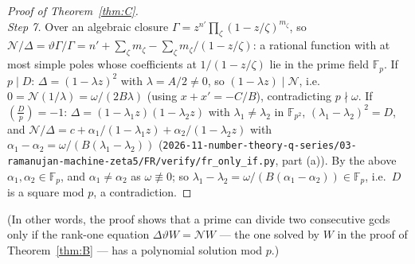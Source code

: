 \documentclass[11pt]{amsart}
\theoremstyle{definition}
\theoremstyle{remark}
\numberwithin{equation}{section}
\newcommand{\F}{\mathbb{F}}
\newcommand{\file}[1]{\nolinkurl{2026-11-number-theory-q-series/03-ramanujan-machine-zeta5/#1}}
\begin{document}
\begin{proof}[Proof of Theorem~\ref{thm:C}]
\[\]
\emph{Step 7.} Over an algebraic closure $\Gamma=z^{n'}\prod_\zeta(1-z/\zeta)^{m_\zeta}$, so $\mathcal N/\Delta=\vartheta\Gamma/\Gamma=n'+\sum_\zeta m_\zeta-\sum_\zeta m_\zeta/(1-z/\zeta)$: a rational function with at most simple poles whose coefficients at $1/(1-z/\zeta)$ lie in the prime field $\F_p$. If $p\mid D$: $\Delta=(1-\lambda z)^2$ with $\lambda=A/2\neq0$, so $(1-\lambda z)\mid\mathcal N$, i.e.\ $0=\mathcal N(1/\lambda)=\omega/(2B\lambda)$ (using $x+x'=-C/B$), contradicting $p\nmid\omega$. If $(\frac Dp)=-1$: $\Delta=(1-\lambda_1z)(1-\lambda_2z)$ with $\lambda_1\neq\lambda_2$ in $\F_{p^2}$, $(\lambda_1-\lambda_2)^2=D$, and $\mathcal N/\Delta=c+\alpha_1/(1-\lambda_1z)+\alpha_2/(1-\lambda_2z)$ with $\alpha_1-\alpha_2=\omega/(B(\lambda_1-\lambda_2))$ (\file{FR/verify/fr_only_if.py}, part (a)). By the above $\alpha_1,\alpha_2\in\F_p$, and $\alpha_1\neq\alpha_2$ as $\omega\not\equiv0$; so $\lambda_1-\lambda_2=\omega/(B(\alpha_1-\alpha_2))\in\F_p$, i.e.\ $D$ is a square mod $p$, a contradiction.
\end{proof}

(In other words, the proof shows that a prime can divide two consecutive gcds only if the rank-one equation $\Delta\vartheta W=\mathcal NW$ --- the one solved by $W$ in the proof of Theorem~\ref{thm:B} --- has a polynomial solution mod $p$.)
\end{document}
